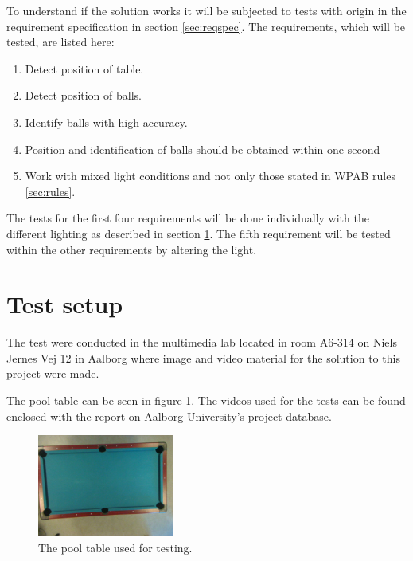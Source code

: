 To understand if the solution works it will be subjected to tests with origin in the requirement specification in section \ref{sec:reqspec}. The requirements, which will be tested, are listed here:

\begin{enumerate}
\setlength{\itemsep}{0mm}
	\item Detect position of table.
	\item Detect position of balls.
	\item Identify balls with high accuracy.
	\item Position and identification of balls should be obtained within one second
	\item Work with mixed light conditions and not only those stated in WPAB rules \ref{sec:rules}.
\end{enumerate}

The tests for the first four requirements will be done individually with the different lighting as described in section \ref{sec:testsetup}. The fifth requirement will be tested within the other requirements by altering the light.

\section{Test setup}
\label{sec:testsetup}
The test were conducted in the multimedia lab located in room A6-314 on Niels Jernes Vej 12 in Aalborg where image and video material for the solution to this project were made. 

The pool table can be seen in figure \ref{fig:pooltableimg}. The videos used for the tests can be found enclosed with the report on Aalborg University's project database.

\begin{figure}[H]
\begin{center}
\leavevmode
\includegraphics[width=0.4\textwidth]{images/test/light/input}
\end{center}
   \caption{The pool table used for testing.}
  \label{fig:pooltableimg}
\end{figure} 

